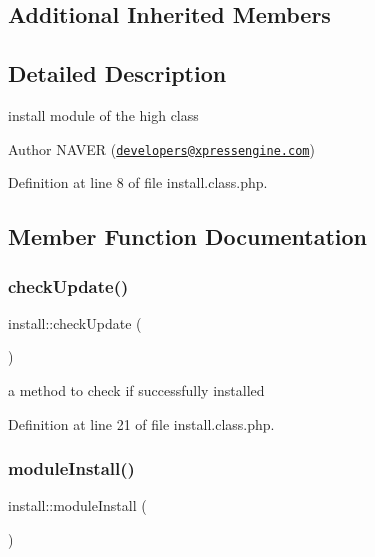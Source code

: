 \subsection*{Additional Inherited Members}


\subsection{Detailed Description}
install module of the high class 

\begin{DoxyAuthor}{Author}
N\+A\+V\+ER (\href{mailto:developers@xpressengine.com}{\tt developers@xpressengine.\+com}) 
\end{DoxyAuthor}


Definition at line 8 of file install.\+class.\+php.



\subsection{Member Function Documentation}
\mbox{\label{classinstall_a45dc7f6b5268beeb21aa3bafa70b5b55}} 
\subsubsection{\texorpdfstring{check\+Update()}{checkUpdate()}}
{\footnotesize\ttfamily install\+::check\+Update (\begin{DoxyParamCaption}{ }\end{DoxyParamCaption})}



a method to check if successfully installed 



Definition at line 21 of file install.\+class.\+php.

\mbox{\label{classinstall_a4fee6fc0a704c9b0789d894f6243fd8d}} 
\subsubsection{\texorpdfstring{module\+Install()}{moduleInstall()}}
{\footnotesize\ttfamily install\+::module\+Install (\begin{DoxyParamCaption}{ }\end{DoxyParamCaption})}



